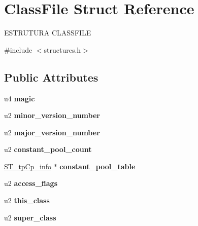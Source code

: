 \hypertarget{structClassFile}{}\section{Class\+File Struct Reference}
\label{structClassFile}




 E\+S\+T\+R\+U\+T\+U\+RA C\+L\+A\+S\+S\+F\+I\+LE  




{\ttfamily \#include $<$structures.\+h$>$}

\subsection*{Public Attributes}
\begin{DoxyCompactItemize}
\item 
\mbox{\label{structClassFile_a09085e9db513dae2f46da6e0a26c1b59}} 
u4 {\bfseries magic}
\item 
\mbox{\label{structClassFile_ac87de07944d29764022d5a2af24b0e82}} 
u2 {\bfseries minor\+\_\+version\+\_\+number}
\item 
\mbox{\label{structClassFile_aa049f58d7c8e929871c2bc36e7e66aba}} 
u2 {\bfseries major\+\_\+version\+\_\+number}
\item 
\mbox{\label{structClassFile_ac8fdf5cccfd632da4fdb21ae63fffa7a}} 
u2 {\bfseries constant\+\_\+pool\+\_\+count}
\item 
\mbox{\label{structClassFile_a05c5727c19ad730369f601079c23515e}} 
\mbox{\hyperlink{structST__tpCp__info}{S\+T\+\_\+tp\+Cp\+\_\+info}} $\ast$ {\bfseries constant\+\_\+pool\+\_\+table}
\item 
\mbox{\label{structClassFile_ae88db578147f7ee0d6fc1aeacb341854}} 
u2 {\bfseries access\+\_\+flags}
\item 
\mbox{\label{structClassFile_a2d33db0a560a71b94bc572dd1e4ec03a}} 
u2 {\bfseries this\+\_\+class}
\item 
\mbox{\label{structClassFile_a5f6c11c0ccb02fd992b5c102725253ec}} 
u2 {\bfseries super\+\_\+class}

\end{DoxyCompactItemize}
